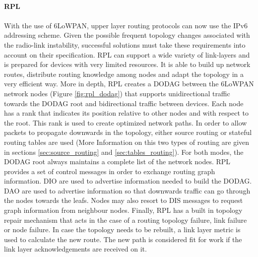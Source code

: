 \paragraph{\textbf{RPL}}
\paragraph{}
With the use of 6LoWPAN, upper layer routing protocols can now use the IPv6 addressing scheme. Given the possible frequent topology changes associated with the radio-link instability, successful  solutions must take these requirements into account on their specification. \gls{RPL} \cite{Winter2012} can support a wide variety of link-layers and is prepared for devices with very limited resources. It is able to build up network routes, distribute routing knowledge among nodes and adapt the topology in a very efficient way. More in depth, \gls{RPL} creates a \gls{DODAG} between the 6LoWPAN network nodes (Figure \ref{fig:rpl_dodag}) that supports unidirectional traffic towards the \gls{DODAG} root and bidirectional traffic between devices. Each node has a rank that indicates its position relative to other nodes and with respect to the root. This rank is used to create optimized network paths. In order to allow packets to propagate downwards in the topology, either source routing or stateful routing tables are used (More Information on this two types of routing are given in sections \ref{sec:source_routing} and \ref{sec:tables_routing}). For both modes, the \gls{DODAG} root always maintains a complete list of the network nodes. \gls{RPL} provides a set of control messages in order to exchange routing graph information. \gls{DIO} are used to advertise information needed to build the \gls{DODAG}. \gls{DAO}  are used to advertise information so that downwards traffic can go through the nodes towards the leafs. Nodes may also resort to \gls{DIS} messages to request graph information from neighbour nodes. Finally, RPL has a built in topology repair mechanism that acts in the case of a routing topology failure, link failure or node failure. In case the topology needs to be rebuilt, a link layer metric is used to calculate the new route. The new path is considered fit for work if the link layer acknowledgements are received on it.

